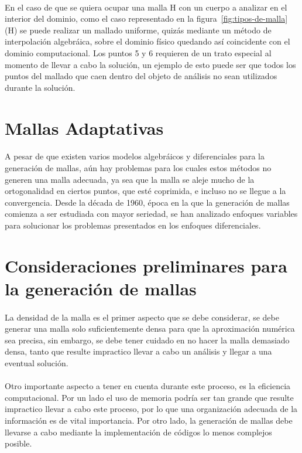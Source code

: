 \documentclass[letterpaper, openright, 12pt]{book}
\begin{document}
    \paragraph*{}
    En el caso de que se quiera ocupar una malla H con un cuerpo a analizar
    en el interior del dominio, como el caso representado en la
    figura~\ref{fig:tipos-de-malla} (H) se puede realizar un mallado uniforme,
    quizás mediante un método de interpolación algebráica, sobre el dominio
    físico quedando así coincidente con el dominio computacional. Los puntos
    5 y 6 requieren de un trato especial al momento de llevar a cabo la
    solución, un ejemplo de esto puede ser que todos los puntos del mallado que
    caen dentro del objeto de análisis no sean utilizados durante la solución.

    \section{Mallas Adaptativas}
    \paragraph*{}
    A pesar de que existen varios modelos algebráicos y diferenciales para
    la generación de mallas, aún hay problemas para los cuales estos métodos
    no generen una malla adecuada, ya sea que la malla se aleje mucho de la
    ortogonalidad en ciertos puntos, que esté coprimida, e incluso no se
    llegue a la convergencia. Desde la década de 1960, época en la que la
    generación de mallas comienza a ser estudiada con mayor seriedad, se han
    analizado enfoques variables para solucionar los problemas presentados
    en los enfoques diferenciales.

    \section{Consideraciones preliminares para la generación de mallas}
    \paragraph*{}
    La densidad de la malla es el primer aspecto que se debe considerar, se
    debe generar una malla solo suficientemente densa para que la
    aproximación numérica sea precisa, sin embargo, se debe tener cuidado en
    no hacer la malla demasiado densa, tanto que resulte impractico llevar a
    cabo un análisis y llegar a una eventual solución.

    \paragraph*{}
    Otro importante aspecto a tener en cuenta durante este proceso, es la
    eficiencia computacional. Por un lado el uso de memoria podría ser tan
    grande que resulte impractico llevar a cabo este proceso, por lo que una
    organización adecuada de la información es de vital importancia. Por
    otro lado, la generación de mallas debe llevarse a cabo mediante la
    implementación de códigos lo menos complejos posible.
\end{document}
